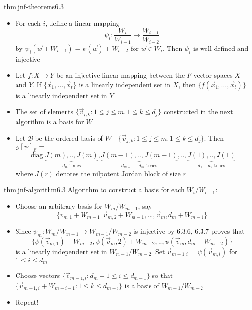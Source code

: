 \documentclass[landscape, 8pt]{extarticle}
\DeclareMathOperator{\diag}{diag}
\begin{document}
\begin{multicols}{3}
\begin{thm}{thm:jnf-theorems}{6.3}
    \begin{itemize}
        \setlength\itemsep{0em}
        \item[\textbf{6.3.6}:] For each $i$, define a linear mapping
            \[\psi_{i} : \frac{W_{i}}{W_{i - 1}} \to \frac{W_{i - 1}}{W_{i - 2}}\]
            by $\psi_{i}(\vec{w} + W_{i - 1}) = \psi(\vec{w}) + W_{i - 2}$ for $\vec{w}\in W_{i}$. Then $\psi_{i}$ is well-defined and injective
        \item[\textbf{6.3.7}:] Let $f : X \to Y$ be an injective linear mapping between the $F$-vector spaces $X$ and $Y$. If $\{\vec{x}_{1},\dots,\vec{x}_{t}\}$ is a linearly independent set in $X$, then $\{f(\vec{x}_{1},\dots,\vec{x}_{t})\}$ is a linearly independent set in $Y$
        \item[\textbf{6.3.8}:] The set of elements $\{\vec{v}_{j,k} : 1 \le j \le m, 1 \le k \le d_{j}\}$ constructed in the next algorithm is a basis for $W$
        \item[\textbf{6.3.9}:] Let $\mathcal{B}$ be the ordered basis of $W$ - $\{\vec{v}_{j,k} : 1 \le j \le m, 1 \le k \le d_{j}\}$. Then ${}_{\mathcal{B}}[\psi]_{\mathcal{B}} = $
            \[\diag \underbrace{J(m),. .,J(m)}_{\text{$d_{m}$ times}}, \underbrace{J(m-1),. .,J(m-1)}_{\text{$d_{m - 1} - d_{m}$ times}},. .,\underbrace{J(1), . .,J(1)}_{\text{$d_{1} - d_{2}$ times}}\]
            where $J(r)$ denotes the nilpotent Jordan block of size $r$
    \end{itemize}
\end{thm}



\begin{thm}{thm:jnf-algorithm}{6.3}
    Algorithm to construct a basis for each $W_{i} / W_{i - 1}$:
    \begin{itemize}[]
        \item Choose an arbitrary basis for $W_{m} / W_{m - 1}$, say
            \[\{v_{m, 1} + W_{m - 1}, \vec{v}_{m, 2} + W_{m - 1},\dots,\vec{v}_{m}, d_{m} + W_{m - 1}\}\]
        \item Since $\psi_{m} : W_{m} / W_{m - 1} \to W_{m - 1} / W_{m - 2}$ is injective by 6.3.6, 6.3.7 proves that 
            \[\{\psi(\vec{v}_{m,1}) + W_{m - 2}, \psi(\vec{v}_{m}, 2) + W_{m - 2}, . . ,\psi(\vec{v}_{m}, d_{m} + W_{m - 2})\}\]
            is a linearly independent set in $W_{m - 1} / W_{m - 2}$. Set $\vec{v}_{m - 1, i} = \psi(\vec{v}_{m, i})$ for $1 \le i \le d_{m}$
        \item Choose vectors $\{\vec{v}_{m - 1, i} : d_{m} + 1 \le i \le d_{m - 1}\}$ so that $\{\vec{v}_{m - 1, i} + W_{m - i - 1} : 1 \le k \le d_{m - i}\}$ is a basis of $W_{m - 1} / W_{m - 2}$
        \item Repeat!
    \end{itemize}
\end{thm}


\end{multicols}
\end{document}
